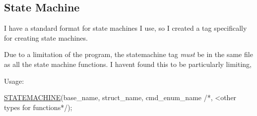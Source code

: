 \subsection*{State Machine}

I have a standard format for state machines I use, so I created a tag specifically for creating state machines.

Due to a limitation of the program, the statemachine tag {\itshape must} be in the same file as all the state machine functions. I haven\textquotesingle{}t found this to be particularly limiting,

Usage\+: 
\begin{DoxyCode}
\hyperlink{Generated__001_8h_ad16363f6583678566864d70afebc6a41}{STATEMACHINE}(base\_name, struct\_name, cmd\_enum\_name \textcolor{comment}{/*, <other types for functions*/});
\end{DoxyCode}


